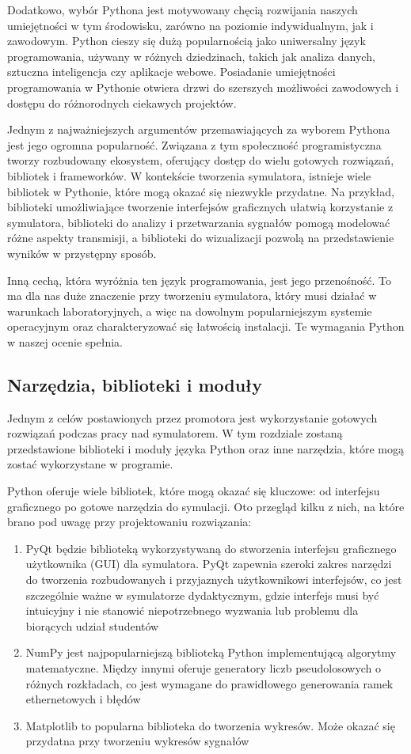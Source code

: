 Dodatkowo, wybór Pythona jest motywowany chęcią rozwijania naszych umiejętności w tym środowisku, zarówno na poziomie indywidualnym, jak i zawodowym. Python cieszy się dużą popularnością jako uniwersalny język programowania, używany w różnych dziedzinach, takich jak analiza danych, sztuczna inteligencja czy aplikacje webowe. Posiadanie umiejętności programowania w Pythonie otwiera drzwi do szerszych możliwości zawodowych i dostępu do różnorodnych ciekawych projektów.

Jednym z najważniejszych argumentów przemawiających za wyborem Pythona jest jego ogromna popularność. Związana z tym społeczność programistyczna tworzy rozbudowany ekosystem, oferujący dostęp do wielu gotowych rozwiązań, bibliotek i frameworków. W kontekście tworzenia symulatora, istnieje wiele bibliotek w Pythonie, które mogą okazać się niezwykle przydatne. Na przykład, biblioteki umożliwiające tworzenie interfejsów graficznych ułatwią korzystanie z symulatora, biblioteki do analizy i przetwarzania sygnałów pomogą modelować różne aspekty transmisji, a biblioteki do wizualizacji pozwolą na przedstawienie wyników w przystępny sposób.

Inną cechą, która wyróżnia ten język programowania, jest jego przenośność. To ma dla nas duże znaczenie przy tworzeniu symulatora, który musi działać w warunkach laboratoryjnych, a więc na dowolnym popularniejszym systemie operacyjnym oraz charakteryzować się łatwością instalacji. Te wymagania Python w naszej ocenie spełnia.

\subsection{Narzędzia, biblioteki i moduły}
Jednym z celów postawionych przez promotora jest wykorzystanie gotowych rozwiązań podczas pracy nad symulatorem. W tym rozdziale zostaną przedstawione biblioteki i moduły języka Python oraz inne narzędzia, które mogą zostać wykorzystane w programie.

Python oferuje wiele bibliotek, które mogą okazać się kluczowe: od interfejsu graficznego po gotowe narzędzia do symulacji. Oto przegląd kilku z nich, na które brano pod uwagę przy projektowaniu rozwiązania:

\begin{enumerate}
    \item PyQt będzie biblioteką wykorzystywaną do stworzenia interfejsu graficznego użytkownika (GUI) dla symulatora. PyQt zapewnia szeroki zakres narzędzi do tworzenia rozbudowanych i przyjaznych użytkownikowi interfejsów, co jest szczególnie ważne w symulatorze dydaktycznym, gdzie interfejs musi być intuicyjny i nie stanowić niepotrzebnego wyzwania lub problemu dla biorących udział studentów
    \item NumPy jest najpopularniejszą biblioteką Python implementującą algorytmy matematyczne. Między innymi oferuje generatory liczb pseudolosowych o różnych rozkładach, co jest wymagane do prawidłowego generowania ramek ethernetowych i błędów
    \item  Matplotlib to popularna biblioteka do tworzenia wykresów. Może okazać się przydatna przy tworzeniu wykresów sygnałów
\end{enumerate}


